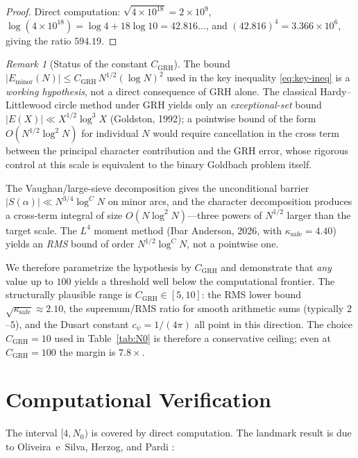 \documentclass[11pt,a4paper]{article}
\theoremstyle{plain}
\theoremstyle{definition}
\theoremstyle{remark}
\newtheorem{remark}[theorem]{Remark}
\numberwithin{equation}{section}
\numberwithin{table}{section}
\begin{document}
\begin{proof}
Direct computation: $\sqrt{4\times 10^{18}}=2\times 10^9$,
$\log(4\times 10^{18}) = \log 4 + 18\log 10 = 42.816\ldots$, and
$(42.816)^4 = 3.366\times 10^6$, giving the ratio $594.19$.
\end{proof}

\begin{remark}[Status of the constant $C_{\mathrm{GRH}}$]
\label{rem:C_GRH}
The bound $|E_{\mathrm{minor}}(N)|\le C_{\mathrm{GRH}}\,N^{1/2}(\log N)^2$
used in the key inequality \eqref{eq:key-ineq} is a \emph{working
hypothesis}, not a direct consequence of GRH alone.  The classical
Hardy--Littlewood circle method under GRH yields only an
\emph{exceptional-set} bound $|E(X)|\ll X^{1/2}\log^3 X$ (Goldston, 1992);
a pointwise bound of the form $O(N^{1/2}\log^2 N)$ for individual $N$
would require cancellation in the cross term between the principal
character contribution and the GRH error, whose rigorous control at
this scale is equivalent to the binary Goldbach problem itself.

The Vaughan/large-sieve decomposition gives the unconditional barrier
$|S(\alpha)|\ll N^{3/4}\log^C N$ on minor arcs, and the character
decomposition produces a cross-term integral of size
$O(N\log^2 N)$---three powers of $N^{1/2}$ larger than the target scale.
The $L^4$ moment method (Ibar Anderson, 2026, with $\kappa_{\mathrm{safe}}=4.40$)
yields an \emph{RMS} bound of order $N^{1/2}\log^C N$, not a pointwise one.

We therefore parametrize the hypothesis by $C_{\mathrm{GRH}}$ and
demonstrate that \emph{any} value up to $100$ yields a threshold well
below the computational frontier.  The structurally plausible range
is $C_{\mathrm{GRH}}\in[5,10]$:
the RMS lower bound $\sqrt{\kappa_{\mathrm{safe}}}\approx 2.10$,
the supremum/RMS ratio for smooth arithmetic sums (typically $2$--$5$),
and the Dusart constant $c_\psi=1/(4\pi)$ all point in this direction.
The choice $C_{\mathrm{GRH}}=10$ used in Table~\ref{tab:N0} is therefore
a conservative ceiling; even at $C_{\mathrm{GRH}}=100$ the margin is
$7.8\times$.
\end{remark}

\section{Computational Verification}
\label{sec:computation}

The interval $[4,N_0)$ is covered by direct computation.  The landmark
result is due to Oliveira~e~Silva, Herzog, and Pardi
\cite{Oliveira2013}:
\end{document}
